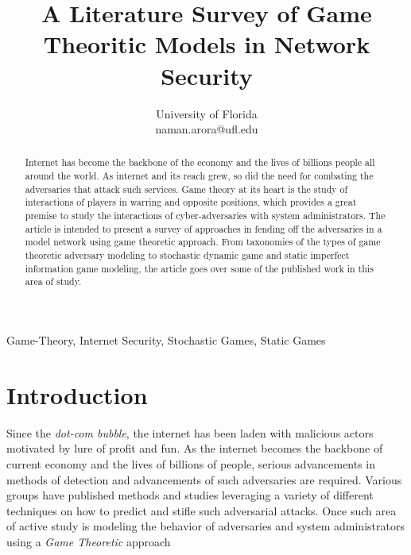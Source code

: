 \documentclass[conference]{IEEEtran}
\begin{document}
\title{A Literature Survey of Game Theoritic Models in Network Security}

\author{
        University of Florida\\
        naman.arora@ufl.edu }

\maketitle

\begin{abstract}
        Internet has become the backbone of the economy and the lives of billions people all around the world.
        As internet and its reach grew, so did the need for combating the adversaries that attack such services.
        Game theory at its heart is the study of interactions of players in warring and opposite positions, which provides a great premise to study the interactions of cyber-adversaries with system administrators.
        The article is intended to present a survey of approaches in fending off the adversaries in a model network using game theoretic approach.
        From taxonomies of the types of game theoretic adversary modeling to stochastic dynamic game and static imperfect information game modeling, the article goes over some of the published work in this area of study.
\end{abstract}

\begin{IEEEkeywords}
        Game-Theory, Internet Security, Stochastic Games, Static Games
\end{IEEEkeywords}

\section*{Introduction}
Since the \textit{dot-com bubble}, the internet has been laden with malicious actors motivated by lure of profit and fun.
As the internet becomes the backbone of current economy and the lives of billions of people, serious advancements in methods of detection and advancements of such adversaries are required.
Various groups have published methods and studies leveraging a variety of different techniques on how to predict and stifle such adversarial attacks.
Once such area of active study is modeling the behavior of adversaries and system administrators using a \textit{Game Theoretic} approach
\end{document}

